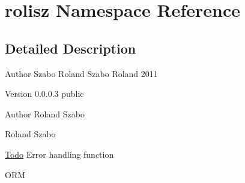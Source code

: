 \hypertarget{namespacerolisz}{
\section{rolisz Namespace Reference}
\label{namespacerolisz}
}


\subsection{Detailed Description}
\begin{DoxyAuthor}{Author}
Szabo Roland  Szabo Roland 2011 
\end{DoxyAuthor}
\begin{DoxyVersion}{Version}
0.0.0.3  public
\end{DoxyVersion}
\begin{DoxyAuthor}{Author}
Roland Szabo

Roland Szabo 
\end{DoxyAuthor}
\begin{Desc}
\item[\hyperlink{todo__todo000001}{Todo}]Error handling function 

ORM \end{Desc}

